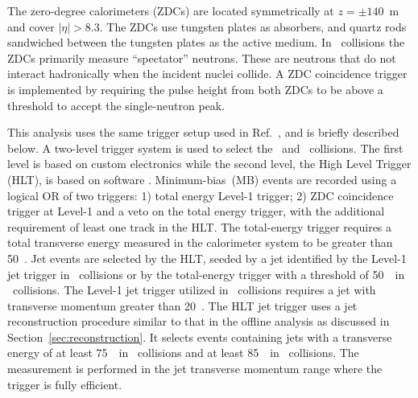 The zero-degree calorimeters (ZDCs) are located symmetrically at $z = \pm140$~m and cover $|\eta| > 8.3$.
The ZDCs use tungsten plates as absorbers, and quartz rods sandwiched between the tungsten plates as the active medium. In \PbPb\ collisions the ZDCs primarily measure ``spectator'' neutrons. These are neutrons that do not interact
hadronically when the incident nuclei collide. A ZDC coincidence trigger is implemented by requiring
the pulse height from both ZDCs to be above a threshold to accept the single-neutron peak.

This analysis uses the same trigger setup used in Ref.~\cite{Aaboud:2018hpb}, and is briefly described below. A two-level trigger system is used to select the \PbPb\ and \pp\ collisions. The first level is based on custom electronics while the second level, the High Level Trigger (HLT), is based on software \cite{Aaboud:2016leb}. 
Minimum-bias~(MB) events are recorded using a logical OR of two triggers: 1) total energy Level-1 trigger; 2) ZDC coincidence trigger at Level-1 and a veto on the total energy trigger, with the additional requirement of least one track in the HLT. The total-energy trigger requires a total transverse energy measured in the calorimeter system to be greater than 50~\GeV.  Jet events are selected by the HLT, seeded by a jet identified by the Level-1 jet trigger in \pp\ collisions or by the total-energy trigger with a threshold of 50~\GeV\ in \PbPb\ collisions. The Level-1 jet trigger utilized in \pp\ collisions requires a jet with transverse momentum greater than 20~\GeV.
The HLT jet trigger uses a jet reconstruction procedure similar to that in the offline
analysis as discussed in Section~\ref{sec:reconstruction}. 
It selects events containing jets with a transverse energy 
of at least 75~\GeV\ in \PbPb\ collisions and at least 
85~\GeV\ in \pp\ collisions. The measurement is performed in the 
jet transverse momentum range where the trigger is fully efficient.






